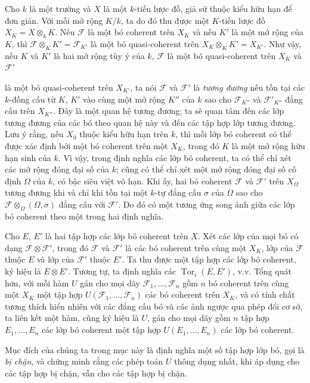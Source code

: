 \documentclass[11pt,twoside,openany]{book}
\numberwithin{equation}{section}
\newcommand{\src}[1]{%
  \phantomsection\hypertarget{src:\fgasourceid:#1}{}%
  \marginpar{\raggedleft\footnotesize\sffamily #1}%
}
\newcommand{\fgasourceid}{unset}
\begin{document}
Cho $k$ là một trường và $X$ là một $k$-tiền lược đồ, giả sử thuộc kiểu hữu hạn
để đơn giản. Với mỗi mở rộng $K/k$, ta do đó thu được một $K$-tiền lược đồ
$X_K=X\otimes_k K$. Nếu $\mathcal F$ là một bó coherent trên $X_K$ và nếu
$K'$ là một mở rộng của $K$, thì
$\mathcal F\otimes_K K'=\mathcal F_{K'}$ là một bó quasi-coherent trên
$X_K\otimes_K K'=X_{K'}$. Như vậy, nếu $K$ và $K'$ là hai mở rộng tùy ý của
$k$, $\mathcal F$ là một bó quasi-coherent trên $X_K$ và $\mathcal F'$
\src{250}
là một bó quasi-coherent trên $X_{K'}$, ta nói $\mathcal F$ và
$\mathcal F'$ là \emph{tương đương} nếu tồn tại các $k$-đồng cấu từ $K$,
$K'$ vào cùng một mở rộng $K''$ của $k$ sao cho $\mathcal F_{K''}$ và
$\mathcal F'_{K''}$ đẳng cấu trên $X_{K''}$. Đây là một quan hệ tương đương;
ta sẽ quan tâm đến các lớp tương đương của các bó theo quan hệ này và đến các
tập hợp lớp tương đương. Lưu ý rằng, nếu $X_0$ thuộc kiểu hữu hạn trên
$k$, thì mỗi lớp bó coherent có thể được xác định bởi một bó coherent trên
một $X_K$, trong đó $K$ là một mở rộng hữu hạn sinh của $k$. Vì vậy, trong
định nghĩa các lớp bó coherent, ta có thể chỉ xét các mở rộng đóng đại số của
$k$; cũng có thể chỉ xét một mở rộng đóng đại số cố định $\Omega$ của $k$, có
bậc siêu việt vô hạn. Khi ấy, hai bó coherent $\mathcal F$ và $\mathcal F'$
trên $X_\Omega$ tương đương khi và chỉ khi tồn tại một $k$-tự đẳng cấu $\sigma$
của $\Omega$ sao cho $\mathcal F\otimes_\Omega(\Omega,\sigma)$ đẳng cấu với
$\mathcal F'$. Do đó có một tương ứng song ánh giữa các lớp bó coherent theo
một trong hai định nghĩa.

Cho $E$, $E'$ là hai tập hợp các lớp bó coherent trên $X$. Xét các lớp của mọi
bó có dạng $\mathcal F\otimes\mathcal F'$, trong đó $\mathcal F$ và
$\mathcal F'$ là các bó coherent trên cùng một $X_K$, lớp của $\mathcal F$
thuộc $E$ và lớp của $\mathcal F'$ thuộc $E'$. Ta thu được một tập hợp các lớp
bó coherent, ký hiệu là $E\otimes E'$. Tương tự, ta định nghĩa các
$\operatorname{Tor}_i(E,E')$, v.v. Tổng quát hơn, với mỗi hàm $U$ gán cho mọi
dãy $\mathcal F_1,\ldots,\mathcal F_n$ gồm $n$ bó coherent trên cùng một $X_K$
một tập hợp $U(\mathcal F_1,\ldots,\mathcal F_n)$ các bó coherent trên $X_K$,
và có tính chất tương thích hiển nhiên với các đẳng cấu bó và các ảnh ngược qua
phép đổi cơ sở, ta liên kết một hàm, cũng ký hiệu là $U$, gán cho mọi dãy gồm
$n$ tập hợp $E_1,\ldots,E_n$ các lớp bó coherent một tập hợp
$U(E_1,\ldots,E_n)$ các lớp bó coherent.

Mục đích của chúng ta trong mục này là định nghĩa một số tập hợp lớp bó, gọi là
\emph{bị chặn}, và chứng minh rằng các phép toán $U$ thông dụng nhất, khi áp
dụng cho các tập hợp bị chặn, vẫn cho các tập hợp bị chặn.
\end{document}
